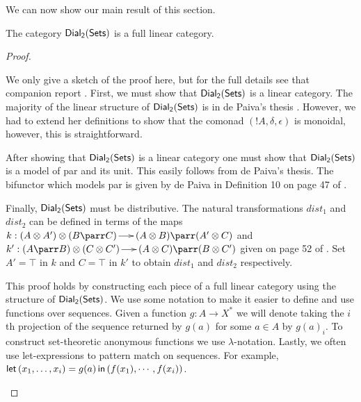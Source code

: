 We can now show our main result of this section.
\begin{lemma}
  \label{lemma:ddial_is_a_linear_category}
  The category $\mathsf{Dial_2}(\mathsf{Sets})$ is a full linear category.
\end{lemma}
\begin{proof}
  \begin{paper}
    We only give a sketch of the proof here, but for the full details
    see that companion report \cite{Eades:2015}.  First, we must show
    that $\mathsf{Dial_2}(\mathsf{Sets})$ is a linear category.  The majority of the linear
    structure of $\mathsf{Dial_2}(\mathsf{Sets})$ is in de Paiva's thesis \cite{dePaiva:1988}.
    However, we had to extend her definitions to show that the comonad
    $(!A,\delta,\epsilon)$ is monoidal, however, this is
    straightforward.

    After showing that $\mathsf{Dial_2}(\mathsf{Sets})$ is a linear category one must show that
    $\mathsf{Dial_2}(\mathsf{Sets})$ is a model of par and its unit.  This easily follows from
    de Paiva's thesis.  The bifunctor which models par is given by de
    Paiva in Definition 10 on page 47 of \cite{dePaiva:1988}.

    Finally, $\mathsf{Dial_2}(\mathsf{Sets})$ must be distributive.  The natural
    transformations $dist_1$ and $dist_2$ can be defined in terms of
    the maps $k : (A \otimes A') \otimes (B \parr C) \to (A \otimes B)
    \parr (A' \otimes C)$ and $k' : (A \parr B) \otimes (C \otimes C')
    \to (A \otimes C) \parr (B \otimes C')$ given on page 52 of
    \cite{dePaiva:1988}.  Set $A' = \top$ in $k$ and $C = \top$ in
    $k'$ to obtain $dist_1$ and $dist_2$ respectively.
  \end{paper}
\begin{report}
  This proof holds by constructing each piece of a full linear
  category using the structure of $\mathsf{Dial_2}(\mathsf{Sets})$.  We use some notation to
  make it easier to define and use functions over sequences.  Given a
  function $g : A \to X^*$ we will denote taking the $i$th projection
  of the sequence returned by $g(a)$ for some $a \in A$ by $g(a)_i$.
  To construct set-theoretic anonymous functions we use
  $\lambda$-notation.  Lastly, we often use let-expressions to pattern
  match on sequences.  For example, $\mathsf{let}\, (x_1,\ldots,x_i) = g(a)
  \,\mathsf{in}\, (f(x_1),\cdots,f(x_i))$.
    

\end{report}
\end{proof}

